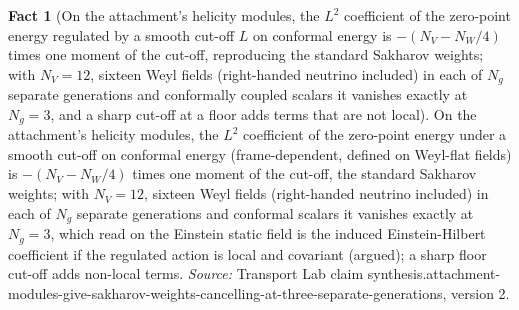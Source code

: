 \documentclass[11pt]{article}
\theoremstyle{definition}
\newtheorem{fact}[theorem]{Fact}
\theoremstyle{plain}
\begin{document}
\begin{fact}[On the attachment's helicity modules, the $L^{2}$ coefficient of the zero-point energy regulated by a smooth cut-off $L$ on conformal energy is $-(N_{V} - N_{W}/4)$ times one moment of the cut-off, reproducing the standard Sakharov weights; with $N_{V} = 12$, sixteen Weyl fields (right-handed neutrino included) in each of $N_{g}$ separate generations and conformally coupled scalars it vanishes exactly at $N_{g} = 3$, and a sharp cut-off at a floor adds terms that are not local]\label{c:synthesis.attachment-modules-give-sakharov-weights-cancelling-at-three-separate-generations}
On the attachment's helicity modules, the $L^{2}$ coefficient of the zero-point energy under a smooth cut-off on conformal energy (frame-dependent, defined on Weyl-flat fields) is $-(N_{V} - N_{W}/4)$ times one moment of the cut-off, the standard Sakharov weights; with $N_{V} = 12$, sixteen Weyl fields (right-handed neutrino included) in each of $N_{g}$ separate generations and conformal scalars it vanishes exactly at $N_{g} = 3$, which read on the Einstein static field is the induced Einstein-Hilbert coefficient if the regulated action is local and covariant (argued); a sharp floor cut-off adds non-local terms.
\emph{Source:} Transport Lab claim synthesis.attachment-modules-give-sakharov-weights-cancelling-at-three-separate-generations, version 2.
\end{fact}
\end{document}
